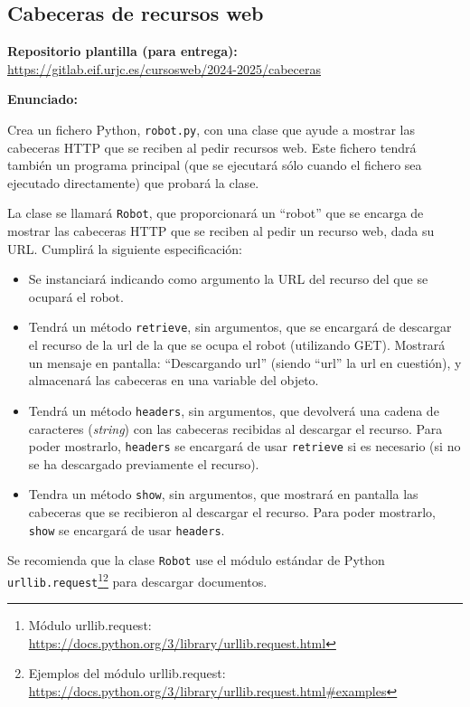 \subsection{Cabeceras de recursos web}
\label{subsec:eje-python-cabreceras}

\textbf{Repositorio plantilla (para entrega):} \\
\url{https://gitlab.eif.urjc.es/cursosweb/2024-2025/cabeceras}

\textbf{Enunciado:}

Crea un fichero Python, \verb|robot.py|, con una clase que ayude a mostrar las cabeceras HTTP que se reciben al pedir recursos web. Este fichero tendrá también un programa principal (que se ejecutará sólo cuando el fichero sea ejecutado directamente) que probará la clase.

La clase se llamará \verb|Robot|, que proporcionará un ``robot'' que se encarga de mostrar las cabeceras HTTP que se reciben al pedir un recurso web, dada su URL. Cumplirá la siguiente especificación:
  \begin{itemize}
  \item Se instanciará indicando como argumento la URL del recurso del que se ocupará el robot.
  \item Tendrá un método \verb|retrieve|, sin argumentos, que se encargará de descargar el recurso de la url de la que se ocupa el robot (utilizando GET). Mostrará un mensaje en pantalla: ``Descargando url'' (siendo ``url'' la url en cuestión), y almacenará las cabeceras en una variable del objeto.
  \item Tendrá un método \verb|headers|, sin argumentos, que devolverá una cadena de caracteres (\emph{string}) con las cabeceras recibidas al descargar el recurso. Para poder mostrarlo, \verb|headers| se encargará de usar \verb|retrieve| si es necesario (si no se ha descargado previamente el recurso).
  \item Tendra un método \verb|show|, sin argumentos, que mostrará en pantalla las cabeceras que se recibieron al descargar el recurso. Para poder mostrarlo, \verb|show| se encargará de usar \verb|headers|.
  \end{itemize}

Se recomienda que la clase \verb|Robot| use el módulo estándar de Python \verb|urllib.request|\footnote{Módulo urllib.request: \\ \url{https://docs.python.org/3/library/urllib.request.html}}\footnote{Ejemplos del módulo urllib.request: \\ \url{https://docs.python.org/3/library/urllib.request.html\#examples}} para descargar documentos.

